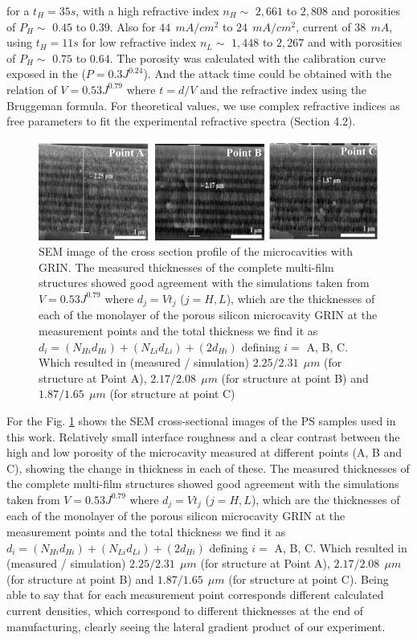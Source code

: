 \documentclass{article}
\begin{document}
for a $t_H=35 s $, with a high refractive index $n_H \sim$ $
2,661$ to $ 2,808$ and porosities of $P_H \sim$ $ 0.45 $ to $
0.39 $. Also for $ 44 \ \ mA /cm^2 $ to $ 24 \ \ mA / cm^2 $, current
of $ 38 \ \ mA $, using $t_H=11 s$  for low refractive index
$n_L\sim$ $ 1,448 $ to $ 2,267 $ and with porosities of
$P_H \sim$ $0.75 $ to $ 0.64 $. The porosity was calculated with
the calibration curve exposed in the ($ P = 0.3J^{0.24} $). And the
attack time could be obtained with the relation of $ V = 0.53J^{0.79}
$ where $ t = d / V $ and the refractive index using the Bruggeman
formula. For theoretical values, we use complex refractive indices as
free parameters to fit the experimental refractive spectra (Section
4.2).
 \begin{figure}
   \centering
   \includegraphics[width=\textwidth]{Images/MCGRINSEM}
   \caption{SEM image of the cross section profile of the
       microcavities with GRIN. The measured thicknesses of the
       complete multi-film structures showed good agreement with the
       simulations taken from $ V = 0.53J ^ {0.79} $ where $d_j=Vt_j$
       ($j=H,L$), which are the thicknesses of each of the monolayer
       of the porous silicon microcavity GRIN at the measurement
       points and the total thickness we find it as $d_i =
       (N_{Hi}d_{Hi})+(N_{Li}d_{Li}) + (2d_{Hi})$
       defining $ i = $ A, B, C. Which resulted in (measured /
       simulation) $ 2.25 / 2.31 \ \ \mu m $ (for structure at Point
       A), $ 2.17 / 2.08 \ \ \mu m $ (for structure at point B) and $
       1.87 / 1.65 \ \ \mu m $ (for structure at point C)}
	\label{fig:MCGRIN4}
\end{figure}

For the Fig. \ref{fig:MCGRIN4} shows the SEM cross-sectional images of
the PS samples used in this work. Relatively small interface
roughness and a clear contrast between the high and low porosity of
the microcavity measured at different points (A, B and C), showing the
change in thickness in each of these. The measured thicknesses of the
complete multi-film structures showed good agreement with the
simulations taken from $ V = 0.53J^{0.79} $ where $d_j=Vt_j$
($j=H,L$), which are the thicknesses of each of the monolayer of the
porous silicon microcavity GRIN at the measurement points and the
total thickness we find it as $d_i =
(N_{Hi}d_{Hi})+(N_{Li}d_{Li}) + (2d_{Hi})$ defining $ i
= $ A, B, C. Which resulted in (measured / simulation) $ 2.25 / 2.31 \
\ \mu m $ (for structure at Point A), $ 2.17 / 2.08 \ \ \mu m $ (for
structure at point B) and $ 1.87 / 1.65 \ \ \mu m $ (for structure at
point C).
Being able to say that for each measurement point corresponds
different calculated current densities, which correspond to different
thicknesses at the end of manufacturing, clearly seeing the lateral
gradient product of our experiment.
\end{document}
